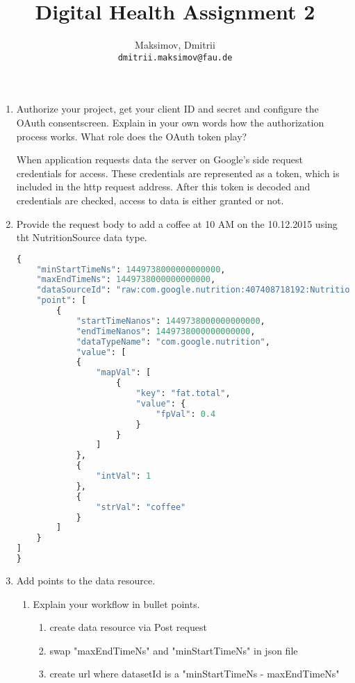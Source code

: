 \documentclass{homework}
\title{Digital Health Assignment 2}
\author{
  Maksimov, Dmitrii\\
  \texttt{dmitrii.maksimov@fau.de}
}
\begin{document}
\maketitle

\setcounter{exercise}{6}
\exercise
\begin{enumerate}
	\item Authorize your project, get your client ID and secret and configure the OAuth consentscreen. Explain in your own words how the authorization process works. What role does the OAuth token play?

	When application requests data the server on Google's side request credentials for access. These credentials are represented as a token, which is included in the http request address. After this token is decoded and credentials are checked, 
access to data is either granted or not.
	\item Provide the request body to add a coffee at 10 AM on the 10.12.2015 using tht NutritionSource data type.
	\begin{lstlisting}[language=Python, caption=the request body to add a coffee at 10 AM on the 10.12.2015, basicstyle=\tiny]
{
    "minStartTimeNs": 1449738000000000000,
    "maxEndTimeNs": 1449738000000000000,
    "dataSourceId": "raw:com.google.nutrition:407408718192:NutritionSource",
    "point": [
        {
            "startTimeNanos": 1449738000000000000,
            "endTimeNanos": 1449738000000000000,
            "dataTypeName": "com.google.nutrition",
            "value": [
            {
                "mapVal": [
                    {
                        "key": "fat.total",
                        "value": {
                            "fpVal": 0.4
                        }
                    }
                ]
            },
            {
                "intVal": 1
            },
            {
                "strVal": "coffee"
            }
        ]
    }
]
}
		\end{lstlisting}
	\item Add points to the data resource.
	\begin{enumerate}[label=\alph*)]
		\item Explain your workflow in bullet points.
		\begin{enumerate}[label=\arabic*)]
			\item create data resource via Post request
			\item swap "maxEndTimeNs" and "minStartTimeNs" in json file
			\item create url where datasetId is a "minStartTimeNs - maxEndTimeNs"

\end{enumerate}
\end{enumerate}
\end{enumerate}
\end{document}
